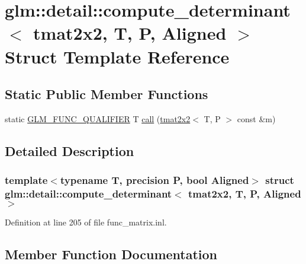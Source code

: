 \hypertarget{structglm_1_1detail_1_1compute__determinant_3_01tmat2x2_00_01_t_00_01_p_00_01_aligned_01_4}{}\section{glm\+::detail\+::compute\+\_\+determinant$<$ tmat2x2, T, P, Aligned $>$ Struct Template Reference}
\label{structglm_1_1detail_1_1compute__determinant_3_01tmat2x2_00_01_t_00_01_p_00_01_aligned_01_4}
\subsection*{Static Public Member Functions}
\begin{DoxyCompactItemize}
\item 
static \mbox{\hyperlink{setup_8hpp_a33fdea6f91c5f834105f7415e2a64407}{G\+L\+M\+\_\+\+F\+U\+N\+C\+\_\+\+Q\+U\+A\+L\+I\+F\+I\+ER}} T \mbox{\hyperlink{structglm_1_1detail_1_1compute__determinant_3_01tmat2x2_00_01_t_00_01_p_00_01_aligned_01_4_a0d29b5bdcb38f4edfc455d097a30c416}{call}} (\mbox{\hyperlink{structglm_1_1tmat2x2}{tmat2x2}}$<$ T, P $>$ const \&m)
\end{DoxyCompactItemize}


\subsection{Detailed Description}
\subsubsection*{template$<$typename T, precision P, bool Aligned$>$\newline
struct glm\+::detail\+::compute\+\_\+determinant$<$ tmat2x2, T, P, Aligned $>$}



Definition at line 205 of file func\+\_\+matrix.\+inl.



\subsection{Member Function Documentation}
\mbox{\label{structglm_1_1detail_1_1compute__determinant_3_01tmat2x2_00_01_t_00_01_p_00_01_aligned_01_4_a0d29b5bdcb38f4edfc455d097a30c416}} 
